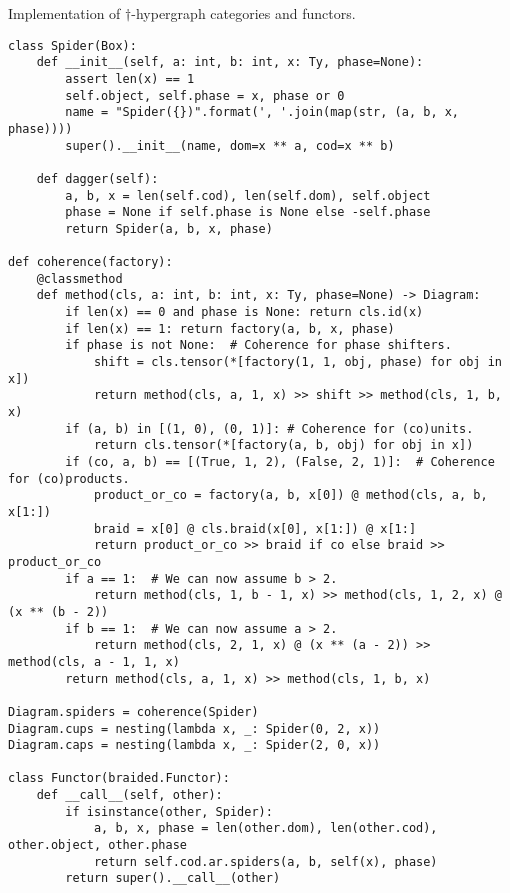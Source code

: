 \begin{python}
{\normalfont Implementation of $\dagger$-hypergraph categories and functors.}

\begin{verbatim}
class Spider(Box):
    def __init__(self, a: int, b: int, x: Ty, phase=None):
        assert len(x) == 1
        self.object, self.phase = x, phase or 0
        name = "Spider({})".format(', '.join(map(str, (a, b, x, phase))))
        super().__init__(name, dom=x ** a, cod=x ** b)

    def dagger(self):
        a, b, x = len(self.cod), len(self.dom), self.object
        phase = None if self.phase is None else -self.phase
        return Spider(a, b, x, phase)

def coherence(factory):
    @classmethod
    def method(cls, a: int, b: int, x: Ty, phase=None) -> Diagram:
        if len(x) == 0 and phase is None: return cls.id(x)
        if len(x) == 1: return factory(a, b, x, phase)
        if phase is not None:  # Coherence for phase shifters.
            shift = cls.tensor(*[factory(1, 1, obj, phase) for obj in x])
            return method(cls, a, 1, x) >> shift >> method(cls, 1, b, x)
        if (a, b) in [(1, 0), (0, 1)]: # Coherence for (co)units.
            return cls.tensor(*[factory(a, b, obj) for obj in x])
        if (co, a, b) == [(True, 1, 2), (False, 2, 1)]:  # Coherence for (co)products.
            product_or_co = factory(a, b, x[0]) @ method(cls, a, b, x[1:])
            braid = x[0] @ cls.braid(x[0], x[1:]) @ x[1:]
            return product_or_co >> braid if co else braid >> product_or_co
        if a == 1:  # We can now assume b > 2.
            return method(cls, 1, b - 1, x) >> method(cls, 1, 2, x) @ (x ** (b - 2))
        if b == 1:  # We can now assume a > 2.
            return method(cls, 2, 1, x) @ (x ** (a - 2)) >> method(cls, a - 1, 1, x)
        return method(cls, a, 1, x) >> method(cls, 1, b, x)

Diagram.spiders = coherence(Spider)
Diagram.cups = nesting(lambda x, _: Spider(0, 2, x))
Diagram.caps = nesting(lambda x, _: Spider(2, 0, x))

class Functor(braided.Functor):
    def __call__(self, other):
        if isinstance(other, Spider):
            a, b, x, phase = len(other.dom), len(other.cod), other.object, other.phase
            return self.cod.ar.spiders(a, b, self(x), phase)
        return super().__call__(other)
\end{verbatim}
\end{python}

